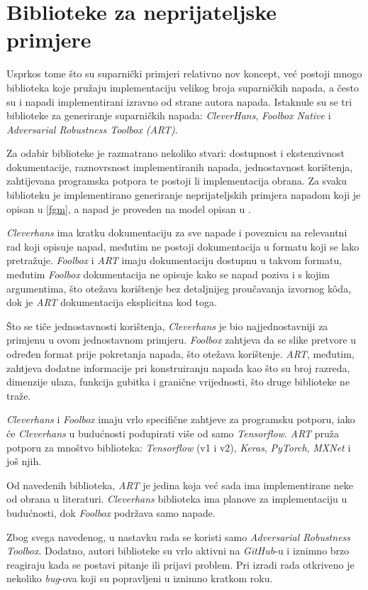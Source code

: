 \documentclass[utf8, diplomski]{fer}
\begin{document}
\section{Biblioteke za neprijateljske primjere}
Usprkos tome što su suparnički primjeri relativno nov koncept, već postoji mnogo biblioteka koje pružaju implementaciju velikog broja suparničkih napada, a često su i napadi implementirani izravno od strane autora napada. Istaknule su se tri biblioteke za generiranje suparničkih napada: \textit{CleverHans}\citep{papernot2018cleverhans}, \textit{Foolbox Native}\citep{rauber2017foolbox} i \textit{Adversarial Robustness Toolbox (ART)}\citep{art2018}.
\par
Za odabir biblioteke je razmatrano nekoliko stvari: dostupnost i ekstenzivnost dokumentacije, raznovrsnost implementiranih napada, jednostavnost korištenja, zahtijevana programska potpora te postoji li implementacija obrana. Za svaku biblioteku je implementirano generiranje neprijateljskih primjera napadom koji je opisan u \ref{fgm}, a napad je proveden na model opisan u .
\par
\textit{Cleverhans} ima kratku dokumentaciju za sve napade i poveznicu na relevantni rad koji opisuje napad, međutim ne postoji dokumentacija u formatu koji se lako pretražuje. \textit{Foolbox} i \textit{ART} imaju dokumentaciju dostupnu u takvom formatu, međutim \textit{Foolbox} dokumentacija ne opisuje kako se napad poziva i s kojim argumentima, što otežava korištenje bez detaljnijeg proučavanja izvornog kôda, dok je \textit{ART} dokumentacija eksplicitna kod toga.
\par
Što se tiče jednostavnosti korištenja, \textit{Cleverhans} je bio najjednostavniji za primjenu u ovom jednostavnom primjeru. \textit{Foolbox} zahtjeva da se slike pretvore u određen format prije pokretanja napada, što otežava korištenje. \textit{ART}, međutim, zahtjeva dodatne informacije pri konstruiranju napada kao što su broj razreda, dimenzije ulaza, funkcija gubitka i granične vrijednosti, što druge biblioteke ne traže.
\par
\textit{Cleverhans} i \textit{Foolbox} imaju vrlo specifične zahtjeve za programsku potporu, iako će \textit{Cleverhans} u budućnosti podupirati više od samo \textit{Tensorflow}. \textit{ART} pruža potporu za mnoštvo biblioteka: \textit{Tensorflow} (v1 i v2), \textit{Keras}, \textit{PyTorch}, \textit{MXNet} i još njih.
\par
Od navedenih biblioteka, \textit{ART} je jedina koja već sada ima implementirane neke od obrana u literaturi. \textit{Cleverhans} biblioteka ima planove za implementaciju u budućnosti, dok \textit{Foolbox} podržava samo napade.
\par
Zbog svega navedenog, u nastavku rada se koristi samo \textit{Adversarial Robustness Toolbox}. Dodatno, autori biblioteke su vrlo aktivni na \textit{GitHub}-u i iznimno brzo reagiraju kada se postavi pitanje ili prijavi problem. Pri izradi rada otkriveno je nekoliko \textit{bug}-ova koji su popravljeni u iznimno kratkom roku.
\end{document}
